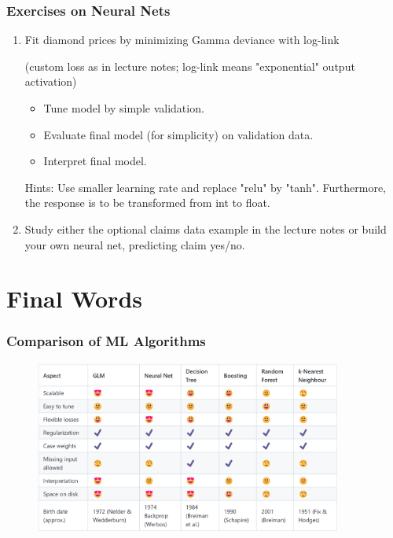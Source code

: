 \documentclass[
    utf8,
    aspectratio=169
]{beamer}  %
\begin{document}
\begin{frame}
	\frametitle{Exercises on Neural Nets}
	\begin{enumerate}
		\item Fit diamond prices by minimizing Gamma deviance with log-link 
		
		(custom loss as in lecture notes; log-link means "exponential" output activation)
		\begin{itemize}
			\item Tune model by simple validation.
			\item Evaluate final model (for simplicity) on validation data.
			\item Interpret final model.
		\end{itemize}
		Hints: Use smaller learning rate and replace "relu" by "tanh". Furthermore, the response is to be transformed from int to float.
		\item Study either the optional claims data example in the lecture notes or build your own neural net, predicting claim yes/no.
	\end{enumerate}
\end{frame}

\section{Final Words}

\begin{frame}
	\frametitle{Comparison of ML Algorithms}
		\begin{figure}
		\includegraphics[width=0.9\textwidth]{pics/algorithms.png}
	\end{figure}
\end{frame}
\end{document}
